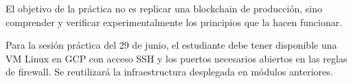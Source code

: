 \documentclass[
  coursetitle={Cómputo Nube y Tecnologías Emergentes},
  coursehours={96},
  coursedate={Verano 2026},
  doctype={Notas de clase},
  otherlangs={english,french},
  authorname={Lázaro},
  authorsurname={Bustio-Martínez},
  authortitle={PhD},
  role={Profesor Investigador},
  email={lbustio@inaoe.mx},
  phone={5559504000},
  ext={7459},
  institution={Instituto Nacional de Astrofísica, Óptica y Electrónica (INAOE)},
  department={Maestría en Ciencias en Tecnologías de Seguridad},
  address={Luis Enrique Erro 1, Sta. Ma. Tonantzintla, San Andrés Cholula, CP 72840, Puebla, México},
  margin={0.5in}
]{../../lbustio_lecture_notes}
\begin{document}
El objetivo de la práctica no es replicar una blockchain de producción, sino comprender y verificar experimentalmente los principios que la hacen funcionar.

\begin{tcolorbox}[title=Prerequisito para la próxima sesión]
Para la sesión práctica del 29 de junio, el estudiante debe tener disponible una VM Linux en GCP con acceso SSH y los puertos necesarios abiertos en las reglas de firewall. Se reutilizará la infraestructura desplegada en módulos anteriores.
\end{tcolorbox}
\end{document}
